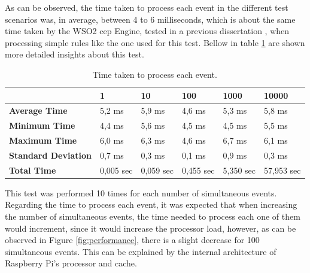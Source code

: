 As can be observed, the time taken to process each event in the different test scenarios was, in average, between 4 to 6 milliseconds, which is about the same time taken by the WSO2 \ac{cep} Engine, tested in a previous dissertation \cite{helder}, when processing simple rules like the one used for this test. Bellow in table \ref{table:event} are shown more detailed insights about this test.

\begin{table}[H]
	\begin{tabular}{l|l|l|l|l|l|}
		\cline{2-6}
		& \textbf{1} & \textbf{10} & \textbf{100} & \textbf{1000} & \textbf{10000} \\ \hline
		\multicolumn{1}{|l|}{\textbf{Average Time}}       & 5,2 ms     & 5,9 ms      & 4,6 ms       & 5,3 ms        & 5,8 ms         \\ \hline
		\multicolumn{1}{|l|}{\textbf{Minimum Time}}       & 4,4 ms     & 5,6 ms      & 4,5 ms       & 4,5 ms        & 5,5 ms         \\ \hline
		\multicolumn{1}{|l|}{\textbf{Maximum Time}}       & 6,0 ms     & 6,3 ms      & 4,6 ms       & 6,7 ms        & 6,1 ms         \\ \hline
		\multicolumn{1}{|l|}{\textbf{Standard Deviation}} & 0,7 ms     & 0,3 ms      & 0,1 ms         & 0,9 ms        & 0,3 ms         \\ \hline
		\multicolumn{1}{|l|}{\textbf{Total Time}}         & 0,005 sec  & 0,059 sec   & 0,455 sec    & 5,350 sec     & 57,953 sec     \\ \hline
	\end{tabular}
	\centering
\caption{Time taken to process each event.}
\label{table:event}
\end{table}

This test was performed 10 times for each number of simultaneous events. Regarding the time to process each event, it was expected that when increasing the number of simultaneous events, the time needed to process each one of them would increment, since it would increase the processor load, however, as can be observed in Figure \ref{fig:performance}, there is a slight decrease for 100 simultaneous events. This can be explained by the internal architecture of Raspberry Pi's processor and cache.

